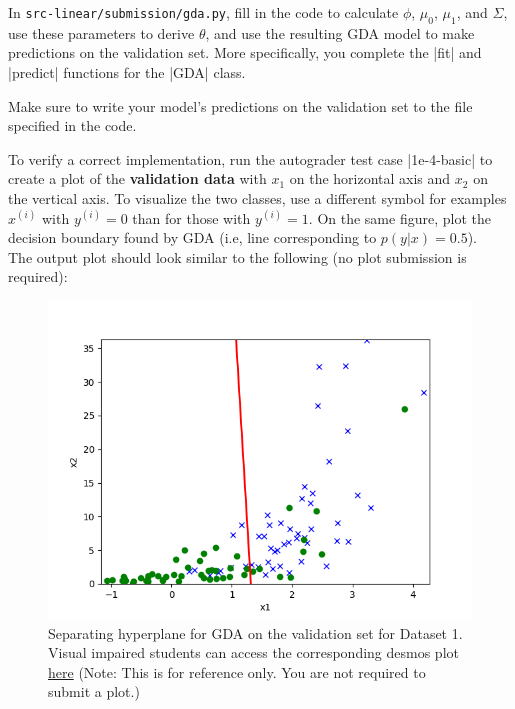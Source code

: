 \item {}
In \texttt{src-linear/submission/gda.py}, fill in the code to calculate $\phi$, $\mu_{0}$, $\mu_{1}$, and $\Sigma$, use these parameters to derive $\theta$, and use the resulting GDA model to make predictions on the validation set. More specifically, you complete the |fit| and |predict| functions for the |GDA| class.

Make sure to write your model's predictions on the validation set to the file specified in the code. 

To verify a correct implementation, run the autograder test case |1e-4-basic| to create a plot of the \textbf{validation data} with $x_1$ on the horizontal axis and $x_2$ on the vertical axis. To visualize the two classes, use a different symbol for examples $x^{(i)}$ with $y^{(i)} = 0$ than for those with $y^{(i)} = 1$. On the same figure, plot the decision boundary found by GDA (i.e, line corresponding to $p(y\vert x) = 0.5$).\\

The output plot should look similar to the following (no plot submission is required): 

\begin{figure}[H]
	\centering
	\vspace{2mm}
	\includegraphics[width=0.65\linewidth]{01-linearclass/p01e_pred_1.png}
    \caption{Separating hyperplane for GDA on the validation set for Dataset 1. Visual impaired students can access the corresponding desmos plot \href{https://www.desmos.com/calculator/sumhryvopb}{here} (Note: This is for reference only.  You are not required to submit a plot.)}
\end{figure}
